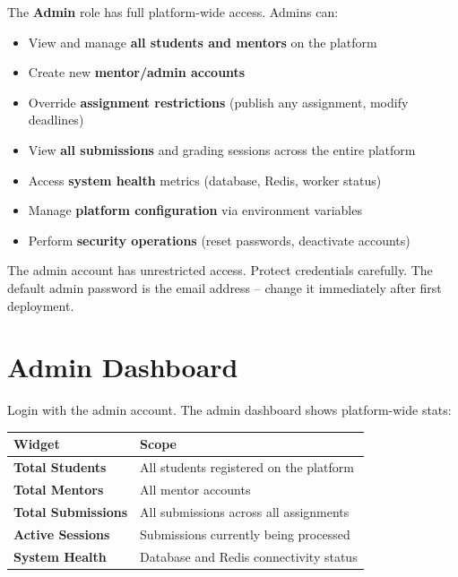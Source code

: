 \documentclass[12pt,a4paper]{article}
\begin{document}
The \textbf{Admin} role has full platform-wide access. Admins can:

\begin{itemize}[leftmargin=*]
  \item View and manage \textbf{all students and mentors} on the platform
  \item Create new \textbf{mentor/admin accounts}
  \item Override \textbf{assignment restrictions} (publish any assignment, modify deadlines)
  \item View \textbf{all submissions} and grading sessions across the entire platform
  \item Access \textbf{system health} metrics (database, Redis, worker status)
  \item Manage \textbf{platform configuration} via environment variables
  \item Perform \textbf{security operations} (reset passwords, deactivate accounts)
\end{itemize}

\begin{dangerbox}
  The admin account has unrestricted access. Protect credentials carefully. The default admin password is the email address -- change it immediately after first deployment.
\end{dangerbox}

\section{Admin Dashboard}

Login with the admin account. The admin dashboard shows platform-wide stats:

\begin{center}
\begin{tabularx}{\linewidth}{>{\bfseries}lX}
\toprule
Widget & Scope \\
\midrule
Total Students    & All students registered on the platform \\
Total Mentors     & All mentor accounts \\
Total Submissions & All submissions across all assignments \\
Active Sessions   & Submissions currently being processed \\
System Health     & Database and Redis connectivity status \\
\bottomrule
\end{tabularx}
\end{center}
\end{document}
